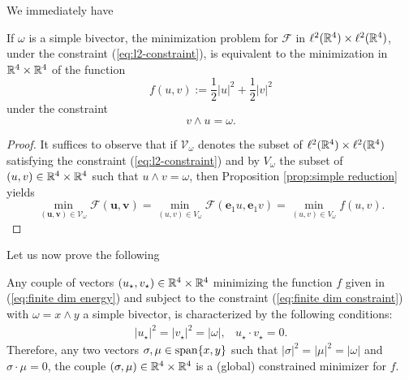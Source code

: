 We immediately have

\begin{corollary}
\label{cor:simple reduction}
If $\omega$ is a simple bivector, the minimization problem for $\mathcal{F}$ in $\ell^2(\mathbb{R}^4) \times \ell^2(\mathbb{R}^4)$, under the constraint (\ref{eq:l2-constraint}), is equivalent to the minimization in $\mathbb{R}^4 \times \mathbb{R}^4$ of the function
\begin{equation}
\label{eq:finite dim energy}
 	f(u,v) := \frac{1}{2}|u|^2 + \frac{1}{2} |v|^2
 \end{equation} 
 under the constraint
 \begin{equation}
 \label{eq:finite dim constraint}
 v \wedge u = \omega.
 \end{equation}
\end{corollary}

\begin{proof}
It suffices to observe that if $\mathcal{V}_{\omega}$ denotes the subset of $\ell^2(\mathbb{R}^4) \times \ell^2(\mathbb{R}^4)$ satisfying the constraint (\ref{eq:l2-constraint}) and by $V_{\omega}$ the subset of $(u, v)  \in \mathbb{R}^4 \times \mathbb{R}^4$ such that $u \wedge v = \omega$, then Proposition \ref{prop:simple reduction} yields
\begin{equation}
\min_{(\mathbf{u}, \mathbf{v}) \in \mathcal{V}_{\omega}}\mathcal{F}(\mathbf{u}, \mathbf{v}) = \min_{(u, v) \in V_\omega} \mathcal{F}(\mathbf{e}_1 u, \mathbf{e}_1 v) = \min_{(u,v) \in V_{\omega}} f(u,v).
\end{equation}
\end{proof}

Let us now prove the following


\begin{proposition}
\label{prop:finite dim minimization}
Any couple of vectors $(u_{\star}, v_{\star}) \in \mathbb{R}^4 \times \mathbb{R}^4$ minimizing the function $f$ given in (\ref{eq:finite dim energy}) and subject to the constraint (\ref{eq:finite dim constraint}) with $\omega = x \wedge y$ a simple bivector, is characterized by the following conditions:
\begin{eqnarray}
\label{eq:finite dim minimization conditions}
|u_{\star}|^2 = |v_{\star}|^2 = |\omega|, & 
u_{\star} \cdot v_{\star} = 0.
\end{eqnarray}
Therefore, any two vectors $\sigma, \mu \in \operatorname{span}\{x, y\}$ such that $|\sigma|^2 = |\mu|^2 =|\omega|$ and $\sigma \cdot \mu = 0$, the couple $(\sigma, \mu) \in \mathbb{R}^4 \times \mathbb{R}^4$ is a (global) constrained minimizer for $f$.
\end{proposition}


